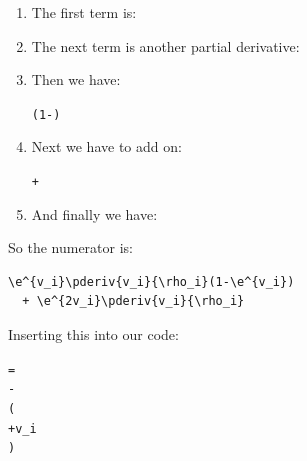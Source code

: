 \begin{enumerate}
\begin{enumerate}

\item The first term is:
\begin{alltt}
\end{alltt}

\item The next term is another partial derivative:
\begin{alltt}
\end{alltt}

\item Then we have:
\begin{alltt}
(1-)
\end{alltt}

\item Next we have to add on:
\begin{alltt}
+
\end{alltt}

\item And finally we have:
\begin{alltt}
\end{alltt}
\end{enumerate}

So the numerator is:
\begin{code}
\begin{verbatim}
\e^{v_i}\pderiv{v_i}{\rho_i}(1-\e^{v_i})
  + \e^{2v_i}\pderiv{v_i}{\rho_i}
\end{verbatim}
\end{code}

Inserting this into our code:\reportpagebreak
\begin{code}
\begin{alltt}
\color{midgray}
 =
-
(
   
  \color{midgray}+ v\_i 
)
\end{alltt}
\color{black}
\end{code}

\end{enumerate}


